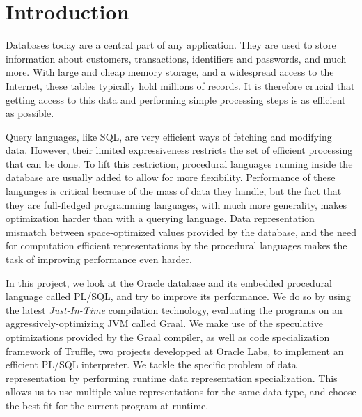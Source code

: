 \documentclass[twoside,11pt,a4paper]{article}
\newcommand{\startsection}[1]{
	\cleardoublepage
	\section{#1}
	\thispagestyle{basic}
}
\begin{document}
\listoffigures



\startsection{Introduction}
\pagestyle{content}

%

Databases today are a central part of any application. They are used to store information about customers, transactions, identifiers and passwords, and much more. With large and cheap memory storage, and a widespread access to the Internet, these tables typically hold millions of records. It is therefore crucial that getting access to this data and performing simple processing steps is as efficient as possible.%

Query languages, like SQL, are very efficient ways of fetching and modifying data. However, their limited expressiveness restricts the set of efficient processing that can be done. To lift this restriction, procedural languages running inside the database are usually added to allow for more flexibility. Performance of these languages is critical because of the mass of data they handle, but the fact that they are full-fledged programming languages, with much more generality, makes optimization harder than with a querying language. Data representation mismatch between space-optimized values provided by the database, and the need for computation efficient representations by the procedural languages makes the task of improving performance even harder.

In this project, we look at the Oracle database and its embedded procedural language called PL/SQL, and try to improve its performance. We do so by using the latest \textit{Just-In-Time} compilation technology, evaluating the programs on an aggressively-optimizing JVM called Graal. We make use of the speculative optimizations provided by the Graal compiler, as well as code specialization framework of Truffle, two projects developped at Oracle Labs, to implement an efficient PL/SQL interpreter. We tackle the specific problem of data representation by performing runtime data representation specialization. This allows us to use multiple value representations for the same data type, and choose the best fit for the current program at runtime.
\end{document}
